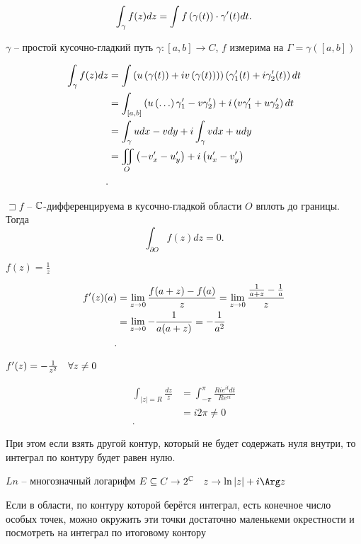\begin{note}
    \[
        \int _\gamma f(z)dz = \int f\left( \gamma(t) \right) \cdot \gamma^{\prime}(t)dt
    .\] 

    $\gamma$ -- простой кусочно-гладкий путь  $\gamma:[a,b] \to C$, $f$ измерима на  $\Gamma  = \gamma\left( [a,b] \right) $

    \begin{align*}
        \int_\gamma f(z)dz &= \int\left( u\left( \gamma(t)) + iv\left( \gamma(t) \right)  \right)  \right) \left( \gamma^{\prime}_1(t) + i\gamma^{\prime}_2(t) \right) dt\\
                           &= \int_{[a,b]} \left( u\left( \ldots \right) \gamma^{\prime}_1 - v\gamma^{\prime}_2 \right)  + i\left( v\gamma^{\prime}_1 + u\gamma^{\prime}_2 \right)dt  \\
                           &= \int_\gamma udx - vdy + i\int_\gamma vdx + udy\\
                           &= \iint_O \left( -v^{\prime}_x - u^{\prime}_y \right) +i\left( u^{\prime}_x - v^{\prime}_y \right)   \\
    .\end{align*}
\end{note}

\begin{theorem}
    [Коши]

    $\sqsupset f$ -- $\mathbb{C}$-дифференцируема в кусочно-гладкой области $O$ вплоть до границы. Тогда 
     \[
         \int_{\partial O}f(z)dz = 0
     .\] 
\end{theorem}
\begin{example}
    $f(z) = \frac{1}{z}$ 

    \begin{align*}
        \p f(z)(a) &= \lim_{z \to 0} \frac{f(a+z) - f(a)}{z} = \lim_{z \to 0} \frac{\frac{1}{a+z}-\frac{1}{a}}{z}\\
                   &= \lim_{z \to 0}  -\frac{1}{a(a+z)} = -\frac{1}{a^2} \\
    .\end{align*}

    $f^{\prime}(z) = -\frac{1}{z^2}\quad \forall z\neq 0$

    \begin{align*}
        \int_{|z| = R}\frac{dz}{z} &= \int _{-\pi }^{\pi } \frac{Rie^{it}dt}{Re^{ei}}\\
                                   &= i 2\pi  \neq 0 \\
    .\end{align*}

    При этом если взять другой контур, который не будет содержать нуля внутри, то интеграл по контуру будет равен нулю.

    $Ln$ -- многозначный логарифм  $E\subseteq C \to 2^\C\quad z \to \ln |z| + i\Arg z$
\end{example}
\begin{note}
    Если в области, по контуру которой берётся интеграл, есть конечное число особых точек, можно окружить эти точки достаточно маленькеми окрестности и посмотреть на интеграл по итоговому контору
\end{note}

